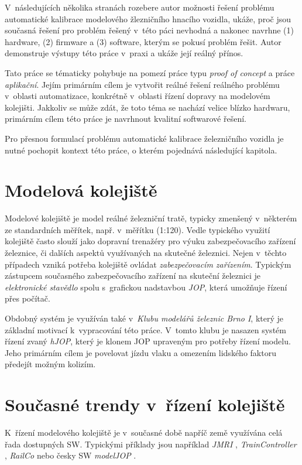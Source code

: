 V~následujících několika stranách rozebere autor možnosti řešení problému
automatické kalibrace modelového žlezničního hnacího vozidla, ukáže, proč
jsou současná řešení pro problém řešený v~této páci nevhodná a nakonec
navrhne (1) hardware, (2) firmware a (3) software, kterým se pokusí problém
řešit. Autor demonstruje výstupy této práce v~praxi a ukáže její reálný
přínos.

Tato práce se tématicky pohybuje na pomezí práce typu \textit{proof of concept}
a práce \textit{aplikační}. Jejím primárním cílem je vytvořit reálné řešení
reálného problému v~oblasti automatizace, konkrétně v~oblasti řízení dopravy na
modelovém kolejišti. Jakkoliv se může zdát, že toto téma se nachází velice
blízko hardwaru, primárním cílem této práce je navrhnout kvalitní softwarové
řešení.

Pro přesnou formulací problému automatické kalibrace železničního vozidla je
nutné pochopit kontext této práce, o kterém pojednává následující kapitola.

\section{Modelová kolejiště}

Modelové kolejiště je model reálné železniční tratě, typicky zmenšený
v~některém ze standardních měřítek, např. v~měřítku  (1:120). Vedle
typického  využití kolejiště často slouží jako dopravní trenažéry pro
výuku zabezpečovacího zařízení železnice, či dalších aspektů využívaných na
skutečné železnici. Nejen v~těchto případech vzniká potřeba kolejiště ovládat
\textit{zabezpečovacím zařízením}. Typickým zástupcem současného
zabezpečovacího zařízení na skuteční železnici je \textit{elektronické
stavědlo} spolu s~grafickou nadstavbou \textit{JOP}, která umožňuje řízení
přes počítač.

Obdobný systém je využíván také v~\textit{Klubu modelářů železnic Brno I},
který je základní motivací k~vypracování této práce. V~tomto klubu je nasazen
systém řízení zvaný \textit{hJOP}, který je klonem JOP upraveným pro potřeby
řízení modelu. Jeho primárním cílem je povelovat jízdu vlaku a omezením
lidského faktoru předejít možným kolizím.

\section{Současné trendy v~řízení kolejiště}

K~řízení modelového kolejiště je v~současné době napříč země využívána celá
řada dostupných SW. Typickými příklady jsou například \textit{JMRI} \cite{},
\textit{TrainController} \cite{}, \textit{RailCo} \cite{} nebo česky SW
\textit{modelJOP} \cite{}.

